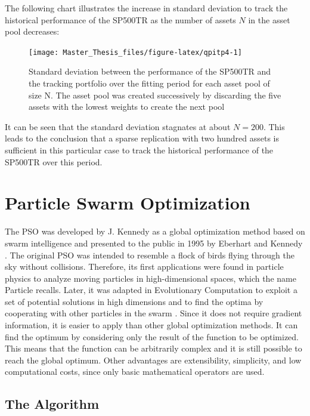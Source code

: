 \documentclass[
  oneside, a4paper, 12pt, openany]{book}
\theoremstyle{definition}
\theoremstyle{definition}
\theoremstyle{definition}
\theoremstyle{definition}
\theoremstyle{remark}
\begin{document}
\normalsize\vspace{0.1cm}

The following chart illustrates the increase in standard deviation to track the historical performance of the SP500TR as the number of assets \(N\) in the asset pool decreases:

\begin{figure}[H]
\texttt{[image: Master\_Thesis\_files/figure-latex/qpitp4-1]} \caption{Standard deviation between the performance of the SP500TR and the tracking portfolio over the fitting period for each asset pool of size N. The asset pool was created successively by discarding the five assets with the lowest weights to create the next pool}\label{fig:qpitp4}
\end{figure}

It can be seen that the standard deviation stagnates at about \(N=200\). This leads to the conclusion that a sparse replication with two hundred assets is sufficient in this particular case to track the historical performance of the SP500TR over this period.

\hypertarget{spso}{%
\chapter{Particle Swarm Optimization}\label{spso}}

The PSO was developed by J. Kennedy as a global optimization method based on swarm intelligence and presented to the public in 1995 by Eberhart and Kennedy \citep{KeEb1995}. The original PSO was intended to resemble a flock of birds flying through the sky without collisions. Therefore, its first applications were found in particle physics to analyze moving particles in high-dimensional spaces, which the name Particle recalls. Later, it was adapted in Evolutionary Computation to exploit a set of potential solutions in high dimensions and to find the optima by cooperating with other particles in the swarm \citep{PaVr2002}. Since it does not require gradient information, it is easier to apply than other global optimization methods. It can find the optimum by considering only the result of the function to be optimized. This means that the function can be arbitrarily complex and it is still possible to reach the global optimum. Other advantages are extensibility, simplicity, and low computational costs, since only basic mathematical operators are used.

\hypertarget{the-algorithm}{%
\section{The Algorithm}\label{the-algorithm}}
\end{document}
